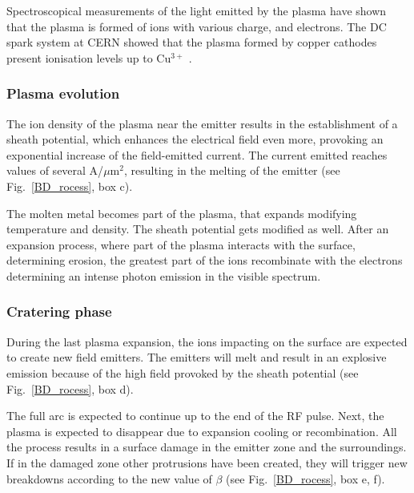 Spectroscopical measurements of the light emitted by the plasma have shown that the plasma is formed of ions with various charge, and electrons. The DC spark system at CERN showed that the plasma formed by copper cathodes present ionisation levels up to Cu$^{3+}$ \cite{Kovermann:1330346}.


\subsubsection[Plasma evolution]{Plasma evolution}

The ion density of the plasma near the emitter results in the establishment of a sheath potential, which enhances the electrical field even more, provoking an exponential  increase of the field-emitted current. The current emitted reaches values of several A/$\mu$m$^2$, resulting in the melting of the emitter (see Fig.~\ref{BD_rocess}, box c).

The molten metal becomes part of the plasma, that expands modifying temperature and density. The sheath potential gets modified as well. After an expansion process, where part of the plasma interacts with the surface, determining erosion, the greatest part of the ions recombinate with the electrons determining an intense photon emission in the visible spectrum.


\subsubsection[Cratering phase]{Cratering phase}

During the last plasma expansion, the ions impacting on the surface are expected to create new field emitters. The emitters will melt and result in an explosive emission because of the high field provoked by the sheath potential (see Fig.~\ref{BD_rocess}, box d). 

The full arc is expected to continue up to the end of the RF pulse. Next, the plasma is expected to disappear due to expansion cooling or recombination. All the process results in a surface damage in the emitter zone and the surroundings. If in the damaged zone other protrusions have been created, they will trigger new breakdowns according to the new value of $\beta$ (see Fig.~\ref{BD_rocess}, box e, f). 

